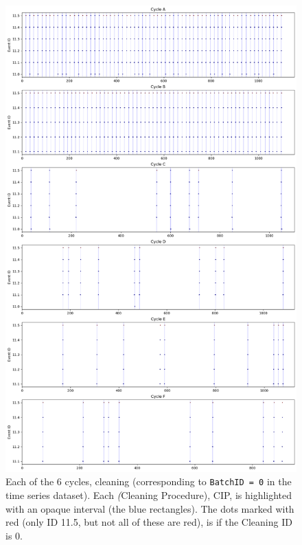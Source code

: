 \documentclass[../Thesis.tex]{subfiles}
\begin{document}
\newpage
\begin{figure}[H]
    \centering
    \includegraphics[width=0.9\linewidth]{figures/Multiple cycles data/Cleaning batches.png}
    \caption{Each of the 6 cycles, cleaning (corresponding to \texttt{BatchID = 0} in the time series dataset). Each \textit(Cleaning Procedure), CIP, is highlighted with an opaque interval (the blue rectangles). The dots marked with red (only ID 11.5, but not all of these are red), is if the Cleaning ID is 0.}
    \label{fig:cycle cleaning time series}
\end{figure}
\end{document}
